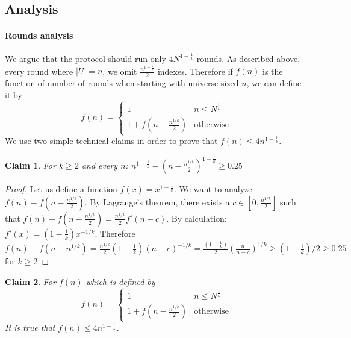 \documentclass{article}
\theoremstyle{plain}
\newtheorem{claim}{Claim}
\begin{document}
\subsection{Analysis}
\paragraph{Rounds analysis}
We argue that the protocol should run only $4N^{1-\frac{1}{k}}$ rounds. As described above, every round where $|U| = n$, we omit $\frac{n^{1-\frac{1}{k}}}{2}$ indexes. Therefore if $f(n)$ is the function of number of rounds when starting with universe sized $n$, we can define it by
    \begin{equation*}
        f(n) = \begin{cases}
               1               & n \leq N^{\frac{1}{k}}\\
               1 + f(n - \frac{n^{1/k}}{2}) & \text{otherwise}
           \end{cases}
    \end{equation*}
We use two simple technical claims in order to prove that $f(n) \leq 4n^{1-\frac{1}{k}}$.
\begin{claim}
    For $k \geq 2$ and every $n$: $n^{1 - \frac{1}{k}} - (n-\frac{n^{1/k}}{2})^{1-\frac{1}{k}} \geq 0.25$
\end{claim}
\begin{proof}
    Let us define a function $f(x) = x^{1-\frac{1}{k}}$. We want to analyze $f(n) - f(n-\frac{n^{1/k}}{2})$. By Lagrange's theorem, there exists a $c \in [0, \frac{n^{1/k}}{2}]$ such that $f(n) - f(n-\frac{n^{1/k}}{2}) = \frac{n^{1/k}}{2} f'(n-c)$. By calculation: $f'(x) = (1-\frac{1}{k})x^{-1/k}$. Therefore $f(n) -  f(n-n^{1/k}) = \frac{n^{1/k}}{2} (1-\frac{1}{k}) (n-c)^{-1/k} = \frac{(1-\frac{1}{k})}{2} (\frac{n}{n-c})^{1/k} \geq (1-\frac{1}{k})/2 \geq 0.25$ for $k \geq 2$ 
\end{proof}
\begin{claim}
    For $f(n)$ which is defined by \newline
    \begin{equation*}
        f(n) = \begin{cases}
               1               & n \leq N^{\frac{1}{k}}\\
               1 + f(n - \frac{n^{1/k}}{2}) & \text{otherwise}
           \end{cases}
    \end{equation*}
    It is true that $f(n) \leq 4n^{1-\frac{1}{k}}$.
\end{claim}
\end{document}
